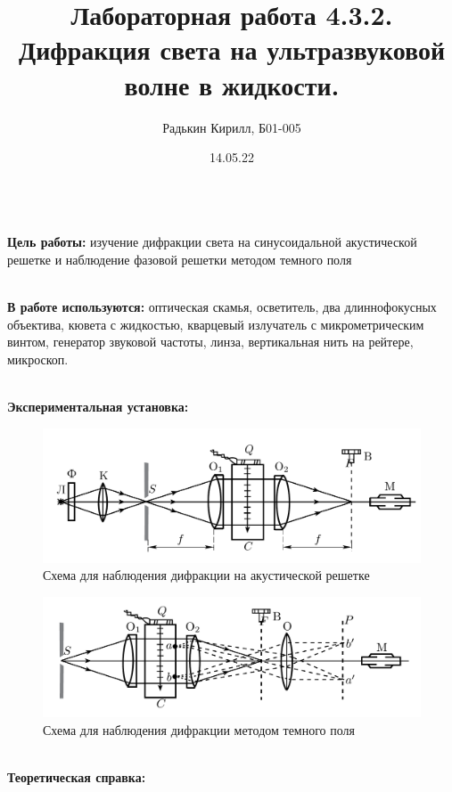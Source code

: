 \documentclass[a4paper, 12pt]{article}
\author{Радькин Кирилл, Б01-005}
\date{14.05.22}
\title{Лабораторная работа 4.3.2. Дифракция света на ультразвуковой волне в жидкости.}
\begin{document}
    \maketitle

    \textbf{\\Цель работы:} изучение дифракции света на синусоидальной акустической решетке и наблюдение фазовой решетки методом темного поля

    \textbf{\\В работе используются:} оптическая скамья, осветитель, два длиннофокусных объектива, кювета с жидкостью, кварцевый излучатель с микрометрическим винтом, генератор звуковой частоты, линза, вертикальная нить на рейтере, микроскоп.

    \textbf{\\Экспериментальная установка:}

    \begin{figure}[!h]
        \centering
        \includegraphics[scale = 0.7]{shema1.png}
        \caption{Схема для наблюдения дифракции на акустической решетке}
        \label{pic1}
    \end{figure}

    \begin{figure}[!h]
        \centering
        \includegraphics[scale = 0.7]{shema2.png}
        \caption{Схема для наблюдения дифракции методом темного поля}
        \label{pic2}
    \end{figure}

    \textbf{\\Теоретическая справка:}
\end{document}
